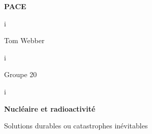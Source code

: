 \documentclass[12pt]{article}
\begin{document}
\begin{center}

{\bfseries
{\LARGE PACE}

\phantom i

{\Large Tom Webber}
}

\phantom i

{\large Groupe 20} 

\phantom i

{\bfseries\large
Nucléaire et radioactivité

Solutions durables ou catastrophes inévitables
}

\end{center}


\flushleft

\begin{bibunit}
\nocite{Becquerel, CEA, curie_museum, EDF, greenpeace, IAEA, ITER, RPUE, Sfen_2023, IRSN}
\putbib
\end{bibunit}

\begin{bibunit}
\nocite{radioactive_2019, Futura, econ}
\putbib
\end{bibunit}
\end{document}

